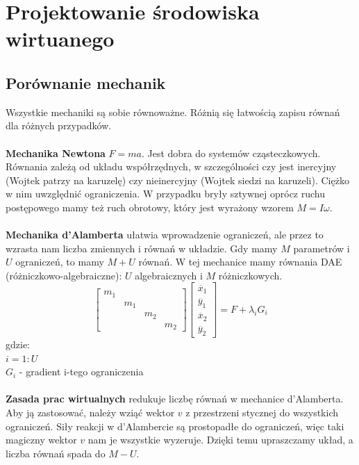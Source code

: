 \documentclass[12pt]{article}
\begin{document}
\section{Projektowanie środowiska wirtuanego}

\subsection{Porównanie mechanik}
Wszystkie mechaniki są sobie równoważne. Różnią się łatwością zapisu równań dla różnych przypadków.\\
~\\
\textbf{Mechanika Newtona} $F = ma$. Jest dobra do systemów cząsteczkowych. Równania zależą od układu współrzędnych, w szczególności czy jest inercyjny (Wojtek patrzy na karuzelę) czy nieinercyjny (Wojtek siedzi na karuzeli). Ciężko w nim uwzględnić ograniczenia. W przypadku bryły sztywnej oprócz ruchu postępowego mamy też ruch obrotowy, który jest wyrażony wzorem $M = I\omega$. \\
~\\
\textbf{Mechanika d'Alamberta} ułatwia wprowadzenie ograniczeń, ale przez to wzrasta nam liczba zmiennych i równań w układzie. Gdy mamy $M$ parametrów i $U$ ograniczeń, to mamy $M + U$ równań.
W tej mechanice mamy równania DAE (różniczkowo-algebraiczne): $U$ algebraicznych i $M$ różniczkowych.
\begin{equation} 	
	\begin{bmatrix}
	m_{1}  &   &   &  
	\\[0.3em]
	  & m_{1} &  &   
	\\[0.3em]
	  &  & m_{2} &  
	  \\[0.3em]
	  &  &  & m_{2}
	\end{bmatrix}
	\begin{bmatrix}
	\ddot{x_{1}}  
	\\[0.3em]
	\ddot{y_{1}}   
	\\[0.3em]
	\ddot{x_{2}}  
	\\[0.3em]
	\ddot{y_{2}}
	\end{bmatrix}
	= F + \lambda _{i} G_{i}	
\end{equation}
gdzie: \\
$i=1:U$ \\
$G_{i}$ - gradient i-tego ograniczenia \\
~\\
\textbf{Zasada prac wirtualnych} redukuje liczbę równań w mechanice d'Alamberta. Aby ją zastosować, należy wziąć wektor $v$ z przestrzeni stycznej do wszystkich ograniczeń. Siły reakcji w d'Alambercie są prostopadłe do ograniczeń, więc taki magiczny wektor $v$ nam je wszystkie wyzeruje. Dzięki temu upraszczamy układ, a liczba równań spada do $M - U$.\\
\end{document}
